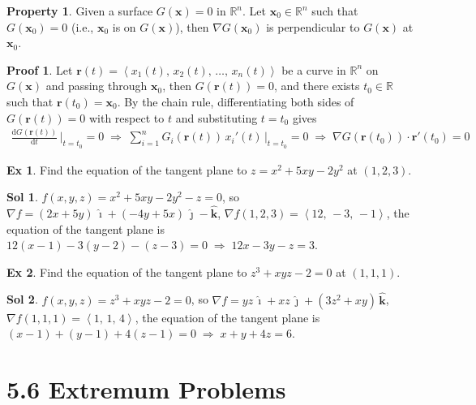 \documentclass[12pt]{extarticle}
\newcommand{\ds}{\displaystyle}
\newcommand{\ie}{\;\Longrightarrow\;}
\newcommand{\llt}{\left\langle}
\newcommand{\rgt}{\right\rangle}
\theoremstyle{definition}
\newtheorem*{prp}{Property}
\newtheorem*{ex}{Ex}
\newtheorem*{sol}{Sol}
\newtheorem*{prf}{Proof}
\newcommand{\vr}{\mathbf{r}}
\newcommand{\vx}{\mathbf{x}}
\newcommand{\hi}{\widehat{\pmb{\imath}}}
\newcommand{\hj}{\widehat{\pmb{\jmath}}}
\newcommand{\hk}{\widehat{\mathbf{k}}}
\newcommand{\diff}[2]{\frac{\mathrm{d} #1}{\mathrm{d} #2}}
\begin{document}
\begin{prp}
  Given a surface $\ds G(\vx) = 0$ in $\mathbb{R}^n$. Let $\ds\vx_0\in\mathbb{R}^n$ such that $\ds G(\vx_0) = 0$ (i.e., $\ds\vx_0$ is on $\ds G(\vx)$), then $\nabla G(\vx_0)$ is perpendicular to $\ds G(\vx)$ at $\vx_0$.  
\end{prp}

\begin{prf}
  Let $\ds\vr(t) = \llt x_1(t),\,x_2(t),\,\ldots,\,x_n(t)\rgt$ be a curve in $\mathbb{R}^n$ on $\ds G(\vx)$ and passing through $\ds\vx_0$, then $\ds G(\vr(t)) = 0$, and there exists $t_0\in\mathbb{R}$ such that $\ds\vr(t_0) = \vx_0$. By the chain rule, differentiating both sides of $\ds G(\vr(t)) = 0$ with respect to $t$ and substituting $t = t_0$ gives 
  \begin{align*}
    \diff{G(\vr(t))}{t}\,\bigg|_{t = t_0} = 0 \ie \sum_{i=1}^n G_i(\vr(t))\,x_i'(t)\,\bigg|_{t = t_0} = 0 \ie \nabla G(\vr(t_0))\cdot\vr'(t_0) = 0
  \end{align*}
\end{prf}

\begin{ex}
  Find the equation of the tangent plane to $z = x^2 + 5xy - 2y^2$ at $(1, 2, 3)$. 
\end{ex}

\begin{sol}
  $\ds f(x, y, z) = x^2 + 5xy - 2y^2 - z = 0$, so $\nabla f = (2x + 5y)\,\hi + (-4y + 5x)\,\hj - \hk$, $\nabla f(1, 2, 3) = \llt12,\,-3,\,-1\rgt$, the equation of the tangent plane is $12(x - 1) - 3(y - 2) - (z - 3) = 0 \ie 12 x - 3y - z = 3$. 
\end{sol}

\begin{ex}
  Find the equation of the tangent plane to $z^3 + xyz - 2 = 0$ at $(1, 1, 1)$. 
\end{ex}

\begin{sol}
  $\ds f(x, y, z) = z^3 + xyz - 2 = 0$, so $\nabla f = yz\,\hi + xz\,\hj + (3z^2 + xy)\,\hk$, $\nabla f(1, 1, 1) = \llt 1,\, 1,\, 4\rgt$, the equation of the tangent plane is $(x - 1) + (y - 1) + 4(z - 1) = 0 \ie x + y + 4z = 6$. 
\end{sol}

\section*{5.6 Extremum Problems}
\end{document}
